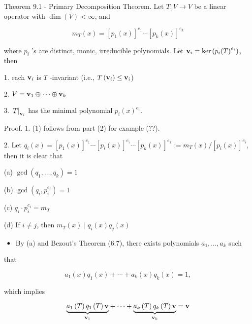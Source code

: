 \documentclass[11pt]{article}
\begin{document}
Theorem 9.1 - Primary Decomposition Theorem. Let \(T : V \rightarrow  V\) be a linear operator with \(\dim \left( V\right)  < \infty\), and

\[
{m}_{T}\left( x\right)  = {\left\lbrack  {p}_1\left( x\right) \right\rbrack  }^{{e}_1}\cdots {\left\lbrack  {p}_{k}\left( x\right) \right\rbrack  }^{{e}_{k}}
\]

where \({p}_{i}\) ’s are distinct, monic, irreducible polynomials. Let \({\bf v}_{i} = \ker \left( {{p}_{i}{\left( T\right) }^{{e}_{i}}}\right)\), then

1. each \({\bf v}_{i}\) is \(T\) -invariant (i.e., \(T\left( {\bf v}_{i}\right)  \leq  {\bf v}_{i}\))

2. \(V = {\bf v}_1 \oplus  \cdots  \oplus  {\bf v}_{k}\)

3. \({\left. T\right| }_{{\bf v}_{i}}\) has the minimal polynomial \({p}_{i}{\left( x\right) }^{{e}_{i}}\).

Proof. 1. (1) follows from part (2) for example (??).

2. Let \({q}_{i}\left( x\right)  = {\left\lbrack  {p}_1\left( x\right) \right\rbrack  }^{{e}_1}\cdots {\left\lbrack  {p}_{i}\left( x\right) \right\rbrack  }^{{e}_{i}}\cdots {\left\lbrack  {p}_{k}\left( x\right) \right\rbrack  }^{{e}_{k}} \mathrel{\text{ := }} {m}_{T}\left( x\right) /{\left\lbrack  {p}_{i}\left( x\right) \right\rbrack  }^{{e}_{i}}\), then it is clear that

(a) \(\gcd \left( {{q}_1,\ldots ,{q}_{k}}\right)  = 1\)

(b) \(\gcd \left( {{q}_{i},{p}_{i}^{{e}_{i}}}\right)  = 1\)

(c) \({q}_{i} \cdot  {p}_{i}^{{e}_{i}} = {m}_{T}\)

(d) If \(i \neq  j\), then \({m}_{T}\left( x\right)  \mid  {q}_{i}\left( x\right) {q}_{j}\left( x\right)\)

\begin{itemize}
\item By (a) and Bezout’s Theorem (6.7), there exists polynomials \({a}_1,\ldots ,{a}_{k}\) such
\end{itemize}

that

\[
{a}_1\left( x\right) {q}_1\left( x\right)  + \cdots  + {a}_{k}\left( x\right) {q}_{k}\left( x\right)  = 1,
\]

which implies

\[
\underset{{\bf v}_1}{\underbrace{{a}_1\left( T\right) {q}_1\left( T\right) \mathbf{v}}} + \cdots  + \underset{{\bf v}_{k}}{\underbrace{{a}_{k}\left( T\right) {q}_{k}\left( T\right) \mathbf{v}}} = \mathbf{v}
\]
\end{document}
